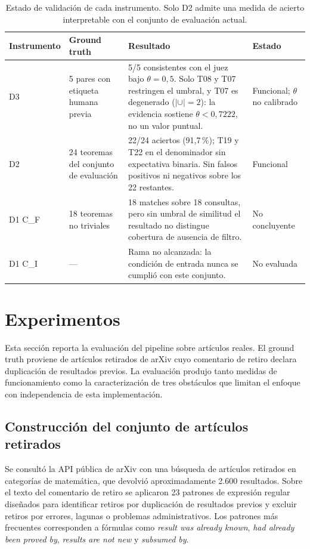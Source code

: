 \documentclass[12pt,a4paper]{article}
\theoremstyle{remark}
\begin{document}
\begin{table}[htbp]
\centering
\small
\setlength{\tabcolsep}{4pt}
\renewcommand{\arraystretch}{1.15}
\begin{tabular}{p{1.9cm}p{2.6cm}p{6.4cm}p{3.4cm}}
\toprule
Instrumento & Ground truth & Resultado & Estado \\
\midrule
D3 &
5 pares con etiqueta humana previa &
5/5 consistentes con el juez bajo $\theta = 0{,}5$. Solo T08 y T07 restringen el
umbral, y T07 es degenerado ($|\cup| = 2$): la evidencia sostiene $\theta < 0{,}7222$, no un valor puntual. &
Funcional; $\theta$ no calibrado \\
\addlinespace
D2 &
24 teoremas del conjunto de evaluación &
22/24 aciertos (91{,}7\,\%); T19 y T22 en el denominador sin expectativa binaria. Sin falsos positivos ni negativos sobre los 22 restantes. &
Funcional \\
\addlinespace
D1 C\_F &
18 teoremas no triviales &
18 matches sobre 18 consultas, pero sin umbral de similitud el resultado no distingue cobertura de ausencia de filtro. &
No concluyente \\
\addlinespace
D1 C\_I &
--- &
Rama no alcanzada: la condición de entrada nunca se cumplió con este conjunto. &
No evaluada \\
\bottomrule
\end{tabular}
\caption{Estado de validación de cada instrumento. Solo D2 admite una medida de acierto interpretable con el conjunto de evaluación actual.}
\label{tab:instrumentos}
\end{table}


\section{Experimentos}
\label{sec:experimentos}

Esta sección reporta la evaluación del pipeline sobre artículos reales. El ground truth proviene de artículos retirados de arXiv cuyo comentario de retiro declara duplicación de resultados previos. La evaluación produjo tanto medidas de funcionamiento como la caracterización de tres obstáculos que limitan el enfoque con independencia de esta implementación.

\subsection{Construcción del conjunto de artículos retirados}

Se consultó la API pública de arXiv con una búsqueda de artículos retirados en categorías de matemática, que devolvió aproximadamente 2.600 resultados. Sobre el texto del comentario de retiro se aplicaron 23 patrones de expresión regular diseñados para identificar retiros por duplicación de resultados previos y excluir retiros por errores, lagunas o problemas administrativos. Los patrones más frecuentes corresponden a fórmulas como \textit{result was already known}, \textit{had already been proved by}, \textit{results are not new} y \textit{subsumed by}.
\end{document}
